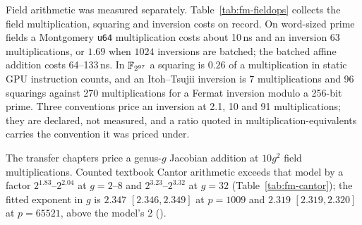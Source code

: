 Field arithmetic was measured separately. Table~\ref{tab:fm-fieldops}
collects the field multiplication, squaring and inversion costs on record.
On word-sized prime fields a Montgomery \texttt{u64} multiplication costs
about 10\,ns and an inversion 63 multiplications, or $1.69$ when $1024$
inversions are batched; the batched affine addition costs 64--133\,ns. In
$\mathbb{F}_{2^{97}}$ a squaring is $0.26$ of a multiplication in static GPU
instruction counts, and an Itoh--Tsujii inversion is 7 multiplications and
96 squarings against 270 multiplications for a Fermat inversion modulo a
256-bit prime. Three conventions price an inversion at 2.1, 10 and 91
multiplications; they are declared, not measured, and a ratio quoted in
multiplication-equivalents carries the convention it was priced under.

\begin{table}[tbp]
\centering\footnotesize

\caption[]{Field operation costs. Top: nanoseconds per operation for the
native \texttt{Fp64}/\texttt{FastCurve} arithmetic and the earlier
\texttt{BigUint} stack, second (lower-load) sample on a shared Apple M4 Pro
(load average about 50),
; $^a$the source flags
the 28-bit inversion as inconsistent with the 61-bit one (contention). The
derived ratios are computed by . Middle:
static PTX instruction counts (\texttt{ptx\_stats2k.sh}, sm\_90; never run
on a GPU) and counted operations per inversion, 
and  (Itoh--Tsujii, 23 September).
Bottom: declared or priced ratios, ,
 and
. No row is validated.}
\label{tab:fm-fieldops}
\end{table}

The transfer chapters price a genus-$g$ Jacobian addition at $10g^2$ field
multiplications. Counted textbook Cantor arithmetic exceeds that model by a
factor $2^{1.83}$--$2^{2.04}$ at $g=2$--$8$ and $2^{3.23}$--$2^{3.32}$ at
$g=32$ (Table~\ref{tab:fm-cantor}); the fitted exponent in $g$ is $2.347$ $[2.346,2.349]$ at $p=1009$ and
$2.319$ $[2.319,2.320]$ at $p=65521$, above the model's 2
().

\begin{table}[tbp]
\centering\footnotesize

\caption[]{Counted multiplications (M) and inversions (I) per textbook
Cantor addition, mean over 200 trials, against the $10g^2$ model; six of
the 13 genera measured. Source:
 (rows
\texttt{kind=genus}, \texttt{op=add}), copied by
. Producer-reported; no validation file.}
\label{tab:fm-cantor}
\end{table}


